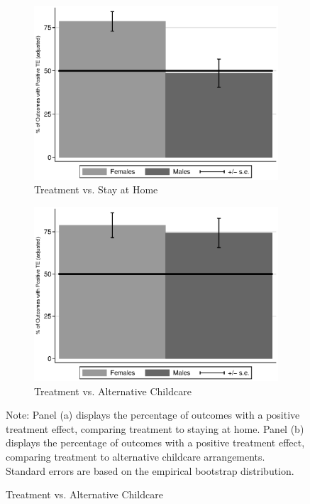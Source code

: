\begin{figure}[!htbp]
\centering
\caption{Positively Impacted Outcomes, ABC/CARE Males and Females}\label{fig:ppositive}
\begin{subfigure}[h]{0.6\textwidth}
		\centering
		\caption{ Treatment vs. Stay at Home} \label{fig:ppositivehome}
		\includegraphics[width=\textwidth]{output/epan_ipw_p0_all.eps}
\end{subfigure}
\begin{subfigure}[h]{0.6\textwidth}
	\centering
	\caption{Treatment vs. Alternative Childcare} \label{fig:ppositivealternative}
		\includegraphics[width=\textwidth]{output/epan_ipw_p1_all.eps}
\end{subfigure}
\footnotesize \justify
Note: Panel (a) displays the percentage of outcomes with a positive treatment effect, comparing treatment to staying at home. Panel (b) displays the percentage of outcomes with a positive treatment effect, comparing treatment to alternative childcare arrangements. Standard errors are based on the empirical bootstrap distribution. \\
\end{figure}


